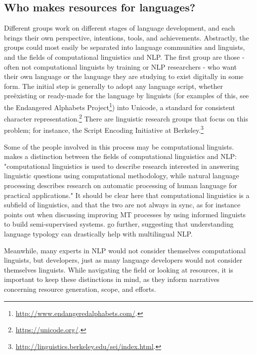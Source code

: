 \subsection{Who makes resources for languages?}
\label{subsec:who-makes-resources}

Different groups  work on different stages of language development, and each brings their own perspective, intentions, tools, and achievements. Abstractly, the groups could most easily be separated into language communities and linguists, and the fields of computational linguistics and NLP. The first group are those - often not computational linguists by training or NLP researchers - who want their own language or the language they are studying to exist digitally in some form. The initial step is generally to adopt any language script, whether  pre\"{e}xisting or ready-made for the language by linguists (for examples of this, see the Endangered Alphabets Project\footnote{\href{http://www.endangeredalphabets.com/}{http://www.endangeredalphabets.com/}. }) into Unicode, a standard for consistent character representation.\footnote{\href{https://unicode.org/}{https://unicode.org/}. } There are linguistic research groups that focus on this problem; for instance, the Script Encoding Initiative at Berkeley.\footnote{\href{http://linguistics.berkeley.edu/sei/index.html}{http://linguistics.berkeley.edu/sei/index.html}. }

Some of the people involved in this process may be computational linguists. \citet{bender2016linguistic} makes a distinction between the fields of computational linguistics and NLP: "computational linguistics is used to describe research interested in answering linguistic questions using computational methodology, while natural language processing describes research on automatic processing of human language for practical applications." It should be clear here that computational linguistics is a subfield of linguistics, and that the two are not always in sync, as for instance \citet{kay1997proper} points out when discussing improving MT processes by using informed linguists to build semi-supervised systems. \citet{bender2010grand, bender2016linguistic} go further, suggesting that understanding language typology can drastically help with multilingual NLP. 

Meanwhile, many experts in NLP would not consider themselves computational linguists, but developers, just as many language developers would not consider themselves linguists. While navigating the field or looking at resources, it is important to keep these distinctions in mind, as they inform narratives concerning resource generation, scope, and efforts.

